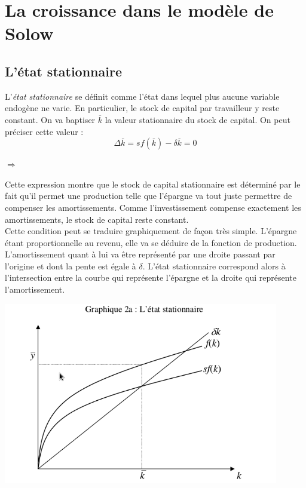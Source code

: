 \documentclass[10pt]{book}
\begin{document}
\section{La croissance dans le modèle de Solow}
\subsection{L'état stationnaire}
L'\textit{état stationnaire} se définit comme l'état dans lequel plus aucune variable endogène ne varie. En particulier, le stock de capital par travailleur y reste constant. On va baptiser $\overline{k}$ la valeur stationnaire du stock de capital. On peut préciser cette valeur :
$$ \Delta \overline{k} = sf(\overline{k}) - \delta\overline{k} = 0 $$ 
\begin{center}
  $\Rightarrow$ 
\end{center}
Cette expression montre que le stock de capital stationnaire est déterminé par le fait qu'il permet une production telle que l'épargne va tout juste permettre de compenser les amortissements. Comme l'investissement compense exactement les amortissements, le stock de capital reste constant. \\
Cette condition peut se traduire graphiquement de façon très simple. L'épargne étant proportionnelle au revenu, elle va se déduire de la fonction de production. L'amortissement quant à lui va être représenté par une droite passant par l'origine et dont la pente est égale à $\delta$. L'état stationnaire correspond alors à l'intersection entre la courbe qui représente l'épargne et la droite qui représente l'amortissement. \\
\begin{center}
  \includegraphics[width=12cm]{graph2.png}
\end{center}
\end{document}
